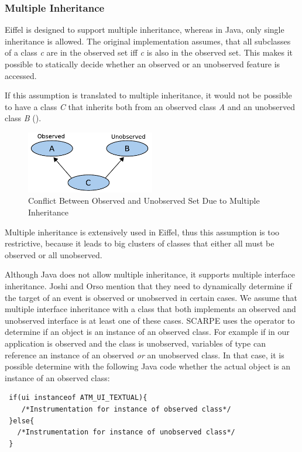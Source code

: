 \subsubsection{Multiple Inheritance}
Eiffel is designed to support multiple inheritance, whereas in Java, only single inheritance is allowed. The original implementation assumes, that all subclasses of a class \emph{c} are in the observed set iff \emph{c} is also in the observed set. This makes it possible to statically decide whether an observed or an unobserved feature is accessed.

If this assumption is translated to multiple inheritance, it would not be possible to have a class \emph{C} that inherits both from an observed class \emph{A} and an unobserved class \emph{B} ().
\begin{figure}[ht]
  \centering
  \includegraphics[width=0.5\textwidth]{illustrations/obs_unobs_multiple_inheritance}
  \caption{Conflict Between Observed and Unobserved Set Due to Multiple Inheritance}
  \label{fig:obs_unobs_multiple_inheritance}
\end{figure}

Multiple inheritance is extensively used in Eiffel, thus this assumption is too restrictive, because it leads to big clusters of classes that either all must be observed or all unobserved.

Although Java does not allow multiple inheritance, it supports multiple interface inheritance. Joshi and Orso \cite{orso05may} mention that they need to dynamically determine if the target of an event is observed or unobserved in certain cases. We assume that multiple interface inheritance with a class that both implements an observed and unobserved interface  is at least one of these cases. SCARPE uses the  operator to determine if an object is an instance of an observed class. For example if in our application  is observed and the class  is unobserved, variables of type  can reference an instance of an observed \emph{or} an unobserved class. In that case, it is possible determine with the following Java code whether the actual object is an instance of an observed class:
\javalisting
\begin{lstlisting}
 if(ui instanceof ATM_UI_TEXTUAL){
    /*Instrumentation for instance of observed class*/
 }else{
   /*Instrumentation for instance of unobserved class*/
 }
\end{lstlisting}
\eiffellisting

